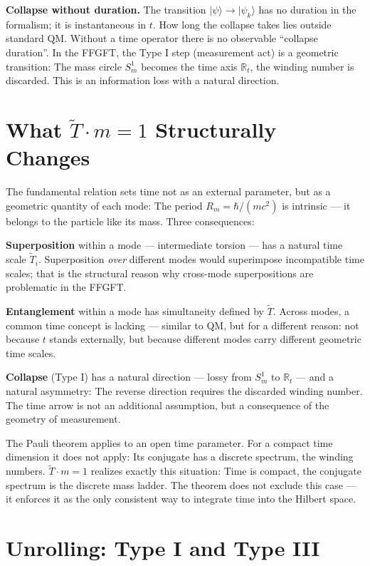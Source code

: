 \textbf{Collapse without duration.} The transition $|\psi\rangle\to|\psi_k\rangle$
has no duration in the formalism; it is instantaneous in $t$. How long the
collapse takes lies outside standard QM. Without a time operator there
is no observable \enquote{collapse duration}. In the FFGFT, the
Type I step (measurement act) is a geometric transition: The mass circle
$S^1_m$ becomes the time axis $\mathbb{R}_t$, the winding number is
discarded. This is an information loss with a natural direction.

\section{What $\tilde T\cdot m = 1$ Structurally Changes}

The fundamental relation sets time not as an external parameter, but as a
geometric quantity of each mode: The period $R_m = \hbar/(mc^2)$ is
intrinsic --- it belongs to the particle like its mass. Three
consequences:

\textbf{Superposition} within a mode --- intermediate torsion
--- has a natural time scale $\tilde T_i$. Superposition
\emph{over} different modes would superimpose incompatible time scales;
that is the structural reason why cross-mode superpositions are problematic in the FFGFT.

\textbf{Entanglement} within a mode has simultaneity defined by
$\tilde T$. Across modes, a common time concept is lacking ---
similar to QM, but for a different reason: not
because $t$ stands externally, but because different modes carry different
geometric time scales.

\textbf{Collapse} (Type I) has a natural direction ---
lossy from $S^1_m$ to $\mathbb{R}_t$ --- and a natural
asymmetry: The reverse direction requires the discarded winding number. The
time arrow is not an additional assumption, but a consequence of the geometry of
measurement.

The Pauli theorem applies to an open time parameter. For a
compact time dimension it does not apply: Its conjugate has a
discrete spectrum, the winding numbers. $\tilde T\cdot m = 1$
realizes exactly this situation: Time is compact, the conjugate
spectrum is the discrete mass ladder. The theorem does not exclude this case
--- it enforces it as the only consistent way to integrate time into
the Hilbert space.

\section{Unrolling: Type I and Type III}

